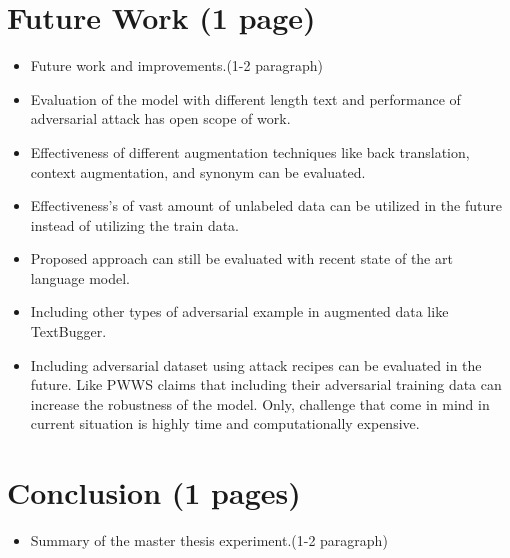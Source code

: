 \documentclass[%
	BCOR=8mm, %
	DIV=12, 
	toc=bibliography, %
	toc=listof, %
	oneside, %
	egregdoesnotlikesansseriftitles, %
	]{scrbook}
\begin{document}
\section{Future Work (1 page)}
\begin{itemize}
\item Future work and improvements.(1-2 paragraph)
\item Evaluation of the model with different length text and performance of adversarial attack has open scope of work. 
\item Effectiveness of different augmentation techniques like back translation, context augmentation, and synonym can be evaluated. 
\item Effectiveness's of vast amount of unlabeled data can be utilized in the future instead of utilizing the train data.
\item Proposed approach can still be evaluated with recent state of the art language model.
\item Including other types of adversarial example in augmented data like TextBugger.
\item Including adversarial dataset using attack recipes can be evaluated in the future. Like PWWS claims that including their adversarial training data can increase the robustness 
of the model. Only, challenge that come in mind in current situation is highly time and computationally expensive. 
\end{itemize}


\section{Conclusion (1 pages)}
\begin{itemize}
\item Summary of the master thesis experiment.(1-2 paragraph)
\end{itemize}










\end{document}

